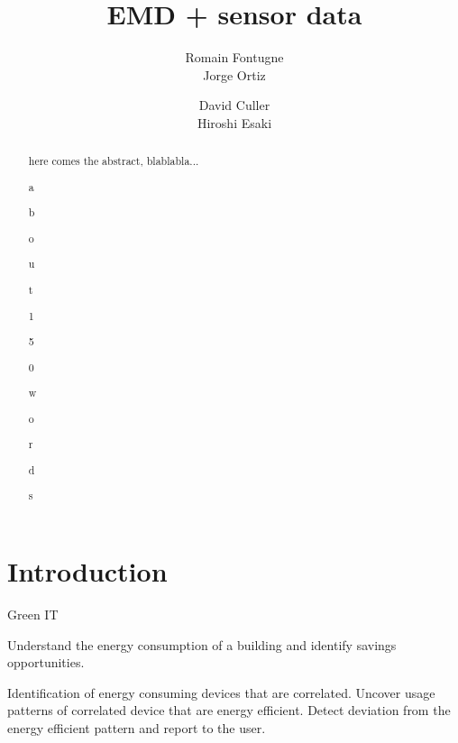 \documentclass[letter,10pt]{sig-alternate-10pt}
\begin{document}
\title{EMD + sensor data}

\author{
\alignauthor
Romain Fontugne\\
\alignauthor
Jorge Ortiz\\
\and  %
\alignauthor
David Culler\\
\alignauthor 
Hiroshi Esaki\\
}

\maketitle

% 
% 

\begin{abstract}
here comes the abstract, blablabla...

a

b

o

u

t

1

5

0

w

o

r

d

s
\end{abstract}

\section{Introduction}
Green IT

Understand the energy consumption of a building and identify savings opportunities.

Identification of energy consuming devices that are correlated.
Uncover usage patterns of correlated device that are energy efficient.
Detect deviation from the energy efficient pattern and report to the user.
\end{document}
